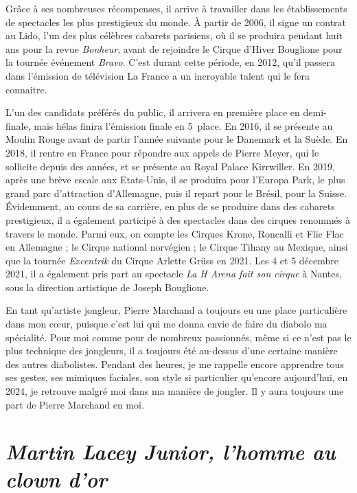 Grâce à ses nombreuses récompenses, il arrive à travailler dans les établissements de spectacles les plus prestigieux du monde. À partir de 2006, il signe un contrat au Lido, l'un des plus célèbres cabarets parisiens, où il se produira pendant huit ans pour la revue \textit{Bonheur}, avant de rejoindre le Cirque d'Hiver Bouglione pour la tournée événement \textit{Bravo}. C'est durant cette période, en 2012, qu'il passera dans l'émission de télévision La France a un incroyable talent qui le fera connaitre.

L'un des candidats préférés du public, il arrivera en première place en demi-finale, mais hélas finira l'émission finale en 5\ieme~place. En 2016, il se présente au Moulin Rouge avant de partir l'année suivante pour le Danemark et la Suède. En 2018, il rentre en France pour répondre aux appels de Pierre Meyer, qui le sollicite depuis des années, et se présente au Royal Palace Kirrwiller. En 2019, après une brève escale aux Etats-Unis, il se produira pour l'Europa Park, le plus grand parc d'attraction d'Allemagne, puis il repart pour le Brésil, pour la Suisse. Évidemment, au cours de sa carrière, en plus de se produire dans des cabarets prestigieux, il a également participé à des spectacles dans des cirques renommés à travers le monde. Parmi eux, on compte les Cirques Krone, Roncalli et Flic Flac en Allemagne ; le Cirque national norvégien ; le Cirque Tihany au Mexique, ainsi que la tournée \textit{Excentrik} du Cirque Arlette Grüss en 2021. Les 4 et 5 décembre 2021, il a également pris part au spectacle \textit{La H Arena fait son cirque} à Nantes, sous la direction artistique de Joseph Bouglione.

En tant qu'artiste jongleur, Pierre Marchand a toujours eu une place particulière dans mon cœur, puisque c'est lui qui me donna envie de faire du diabolo ma spécialité. Pour moi comme pour de nombreux passionnés, même si ce n’est pas le plus technique des jongleurs, il a toujours été au-dessus d'une certaine manière des autres diabolistes. Pendant des heures, je me rappelle encore apprendre tous ses gestes, ses mimiques faciales, son style si particulier qu'encore aujourd'hui, en 2024, je retrouve malgré moi dans ma manière de jongler. Il y aura toujours une part de Pierre Marchand en moi.

\section*{\textit{Martin Lacey Junior, l'homme au clown d'or}}
{}

